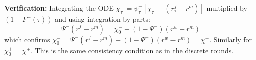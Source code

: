 \textbf{Verification:} Integrating the ODE $\dot{\chi}_{\tau}^{-} = \psi_{\tau}^{-}[\chi_{\tau}^{-} - (r_{\tau}^{f} - r^{m})]$ multiplied by $(1-F^{-}(\tau))$ and using integration by parts:
\[
\Psi^{-}(\overline{r}^{f} - r^{m}) = \chi_{0}^{-} - (1-\Psi^{-})(r^{w} - r^{m})
\]
which confirms $\chi_{0}^{-} = \Psi^{-}(\overline{r}^{f} - r^{m}) + (1-\Psi^{-})(r^{w} - r^{m}) = \chi^{-}$. Similarly for $\chi_{0}^{+} = \chi^{+}$. This is the same consistency condition as in the discrete rounds. 